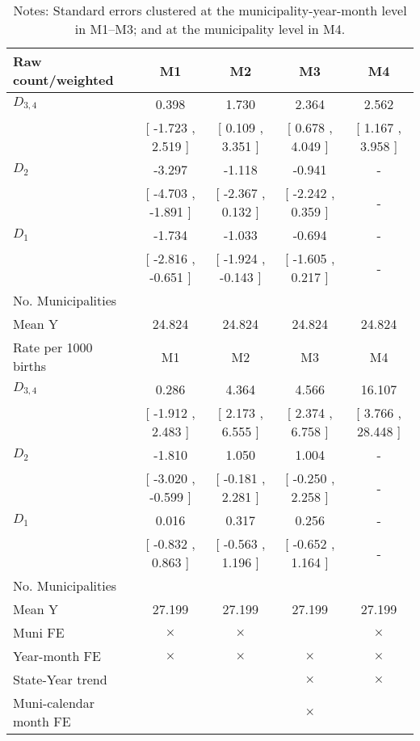 \begin{table}[!ht]
\centering
\caption{Effects of Drought on anomalia}\label{tab:twfe_anomalia}
\fontsize{10pt}{12pt}\selectfont
\begin{tabular}{lcccc}
\toprule
  Raw count/weighted &\multicolumn{1}{c}{M1}&\multicolumn{1}{c}{M2}&\multicolumn{1}{c}{M3}&\multicolumn{1}{c}{M4} \\
\midrule
 $ D_{3,4} $ &     0.398 &     1.730 &     2.364 &     2.562 \\ 
 & [    -1.723 ,     2.519 ] & [     0.109 ,     3.351 ] & [     0.678 ,     4.049 ] & [     1.167 ,     3.958 ] \\ 
\addlinespace
 $ D_2 $ &    -3.297 &    -1.118 &    -0.941 & - \\ 
 & [    -4.703 ,    -1.891 ] & [    -2.367 ,     0.132 ] & [    -2.242 ,     0.359 ] & - \\ 
\addlinespace
 $ D_1 $ &    -1.734 &    -1.033 &    -0.694 & - \\ 
 & [    -2.816 ,    -0.651 ] & [    -1.924 ,    -0.143 ] & [    -1.605 ,     0.217 ] & - \\ 
\addlinespace
\midrule
  No. Municipalities &  &  &  &   \\
  Mean Y &    24.824 &    24.824 &    24.824 &    24.824  \\
\addlinespace
\midrule
  Rate per 1000 births &\multicolumn{1}{c}{M1}&\multicolumn{1}{c}{M2}&\multicolumn{1}{c}{M3}&\multicolumn{1}{c}{M4} \\
\midrule
 $ D_{3,4} $ &     0.286 &     4.364 &     4.566 &    16.107 \\ 
 & [    -1.912 ,     2.483 ] & [     2.173 ,     6.555 ] & [     2.374 ,     6.758 ] & [     3.766 ,    28.448 ] \\ 
\addlinespace
 $ D_2 $ &    -1.810 &     1.050 &     1.004 & - \\ 
 & [    -3.020 ,    -0.599 ] & [    -0.181 ,     2.281 ] & [    -0.250 ,     2.258 ] & - \\ 
\addlinespace
 $ D_1 $ &     0.016 &     0.317 &     0.256 & - \\ 
 & [    -0.832 ,     0.863 ] & [    -0.563 ,     1.196 ] & [    -0.652 ,     1.164 ] & - \\ 
\midrule
  No. Municipalities &  &  &  &   \\
  Mean Y &    27.199 &    27.199 &    27.199 &    27.199  \\
  Muni FE & $ \times $ & $ \times $ &  & $ \times $  \\
  Year-month FE & $ \times $ & $ \times $ & $ \times $ & $ \times $ \\
  State-Year trend &  &  & $ \times $ & $ \times $ \\
  Muni-calendar month FE &  &  & $ \times $ & \\
\bottomrule
\end{tabular}
\caption*{\footnotesize{Notes: Standard errors clustered at the municipality-year-month level in M1--M3; and at the municipality level in M4.}}
\end{table}
